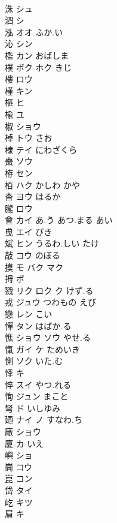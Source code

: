 \documentclass[8pt]{extreport}
\begin{document}
\begin{CJK}{UTF8}{min}
\\	洙	シュ			
\\	泗	シ			
\\	泓	オオ ふか.い			
\\	沁	シン			
\\	檻	カン おばしま			
\\	樸	ボク ホク きじ			
\\	樓	ロウ			
\\	槿	キン			
\\	榧	ヒ			
\\	楡	ユ			
\\	椒	ショウ			
\\	棹	トウ さお			
\\	棣	テイ にわざくら			
\\	棗	ソウ			
\\	栫	セン			
\\	栢	ハク かしわ かや			
\\	杳	ヨウ はるか			
\\	朧	ロウ			
\\	會	カイ あ.う あつ.まる あい			
\\	曵	エイ びき					
\\	斌	ヒン うるわ.しい たけ			
\\	敲	コウ のぼる			
\\	摸	モ バク マク			
\\	拇	ボ			
\\	戮	リク ロク ク けず.る			
\\	戎	ジュウ つわもの えび			
\\	戀	レン こい			
\\	憚	タン はばか.る			
\\	憔	ショウ ソウ やせ.る			
\\	愾	ガイ ケ ためいき			
\\	惻	ソク いた.む			
\\	悸	キ			
\\	悴	スイ やつ.れる			
\\	恂	ジュン まこと			
\\	弩	ド いしゆみ			
\\	廼	ナイ ノ すなわ.ち			
\\	廠	ショウ			
\\	廈	カ いえ			
\\	嶼	ショ			
\\	崗	コウ			
\\	崑	コン			
\\	岱	タイ			
\\	屹	キツ			
\\	屓	キ			

\end{CJK}
\end{document}
